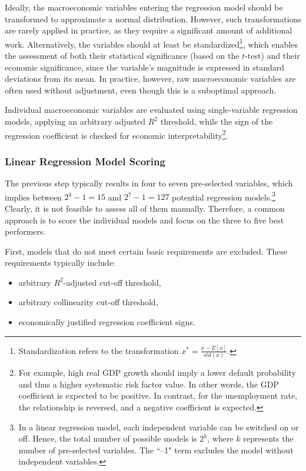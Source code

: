 \documentclass[11pt,a4paper]{article}
\begin{document}
Ideally, the macroeconomic variables entering the regression model should be transformed to approximate a normal distribution. However, such transformations are rarely applied in practice, as they require a significant amount of additional work. Alternatively, the variables should at least be standardized\footnote{Standardization refers to the transformation $x^*=\frac{x - E[x]}{std(x)}$.}, which enables the assessment of both their statistical significance (based on the $t$-test) and their economic significance, since the variable's magnitude is expressed in standard deviations from its mean. In practice, however, raw macroeconomic variables are often used without adjustment, even though this is a suboptimal approach.

Individual macroeconomic variables are evaluated using single-variable regression models, applying an arbitrary adjusted $R^2$ threshold, while the sign of the regression coefficient is checked for economic interpretability\footnote{For example, high real GDP growth should imply a lower default probability and thus a higher systematic risk factor value. In other words, the GDP coefficient is expected to be positive. In contrast, for the unemployment rate, the relationship is reversed, and a negative coefficient is expected.}.

\subsubsection{Linear Regression Model Scoring}

The previous step typically results in four to seven pre-selected variables, which implies between $2^4 - 1 = 15$ and $2^7 - 1 = 127$ potential regression models.\footnote{In a linear regression model, each independent variable can be switched on or off. Hence, the total number of possible models is $2^k$, where $k$ represents the number of pre-selected variables. The ``–1" term excludes the model without independent variables.} Clearly, it is not feasible to assess all of them manually. Therefore, a common approach is to score the individual models and focus on the three to five best performers.

First, models that do not meet certain basic requirements are excluded. These requirements typically include:
\begin{itemize}
\item arbitrary $R^2$-adjusted cut-off threshold,
\item arbitrary collinearity cut-off threshold,
\item economically justified regression coefficient signs.
\end{itemize}
\end{document}
